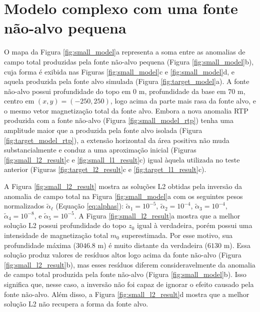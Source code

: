 \section{Modelo complexo com uma fonte não-alvo pequena}
\label{sec:target_source_with_small_interference}


O mapa da Figura \ref{fig:small_model}a representa a soma entre as anomalias de campo total produzidas pela fonte não-alvo pequena (Figura \ref{fig:small_model}b), cuja forma é exibida nas Figuras \ref{fig:small_model}c e \ref{fig:small_model}d, e aquela produzida pela fonte alvo simulada (Figura \ref{fig:target_model}a). 
A fonte não-alvo possui profundidade do topo em $0$ m, profundidade da base em $70$ m, 
centro em $(x, y) = (-250, 250)$, logo acima da parte mais rasa da fonte alvo, e o mesmo vetor magnetização total da fonte alvo.
Embora a nova anomalia RTP produzida com a fonte não-alvo (Figura 
\ref{fig:small_model_rtp}) tenha uma amplitude maior que a produzida pela fonte alvo isolada (Figura \ref{fig:target_model_rtp}), a extensão horizontal da área positiva não muda substancialmente e conduz a uma aproximação inicial
(Figuras \ref{fig:small_l2_result}c e \ref{fig:small_l1_result}c) igual àquela utilizada no teste anterior (Figuras \ref{fig:target_l2_result}c e 
\ref{fig:target_l1_result}c).

A Figura \ref{fig:small_l2_result} mostra as soluções L2 obtidas pela inversão da anomalia de campo total na Figura \ref{fig:small_model}a
com os seguintes pesos normalizados $\tilde{\alpha}_{\ell}$ (Equação \ref{eq:alphas}):
$\tilde{\alpha}_{1} = 10^{-5}$, $\tilde{\alpha}_{2} = 10^{-4}$, 
$\tilde{\alpha}_{3} = 10^{-4}$, $\tilde{\alpha}_{4} = 10^{-8}$, e 
$\tilde{\alpha}_{5} = 10^{-5}$.
A Figura \ref{fig:small_l2_result}a mostra que a melhor solução L2 possui profundidade do topo $z_{0}$ igual à verdadeira, porém possui uma intensidade de magnetização total $m_{0}$ superestimada. Por esse motivo, sua profundidade máxima 
($3046.8$ m) é muito distante da verdadeira ($6130$ m).
Essa solução produz valores de resíduos altos logo acima da fonte não-alvo 
(Figura \ref{fig:small_l2_result}b), mas esses resíduos diferem consideravelmente da anomalia de campo total produzida pela fonte não-alvo (Figura \ref{fig:small_model}b).
Isso significa que, nesse caso, a inversão não foi capaz de ignorar o efeito causado pela fonte não-alvo.
Além disso, a Figura \ref{fig:small_l2_result}d mostra que a melhor solução L2 não recupera a forma da fonte alvo.

